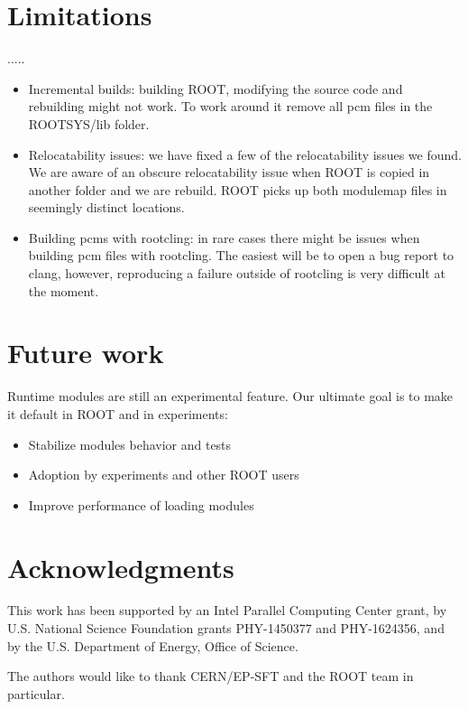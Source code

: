 \documentclass{webofc}
\begin{document}
\section{Limitations}
.....
\begin{itemize}
\item Incremental builds: building ROOT, modifying the source code and rebuilding might not work. To work around it remove all pcm files in the ROOTSYS/lib folder.

\item Relocatability issues: we have fixed a few of the relocatability issues we
found. We are aware of an obscure relocatability issue when ROOT is copied in another folder and we are rebuild. ROOT picks up both modulemap files in seemingly distinct locations.

\item Building pcms with rootcling: in rare cases there might be issues when building pcm files with rootcling. The easiest will be to open a bug report to clang, however, reproducing a failure outside of rootcling is very difficult at the moment.
\end{itemize}

\section{Future work}
Runtime modules are still an experimental feature. Our ultimate goal is to make it default in ROOT and in experiments:

\begin{itemize}
    \item Stabilize modules behavior and tests
    \item Adoption by experiments and other ROOT users
    \item Improve performance of loading modules
\end{itemize}


\section{Acknowledgments}

This work has been supported by an Intel Parallel Computing Center grant, by U.S. National Science Foundation grants PHY-1450377 and PHY-1624356, and by the U.S. Department of Energy, Office of Science.

The authors would like to thank CERN/EP-SFT and the ROOT team in particular.
\end{document}
